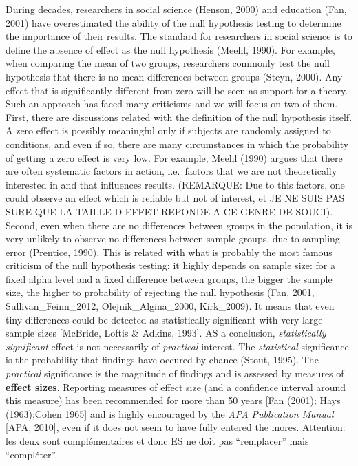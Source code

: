 \documentclass[man]{apa6}
\begin{document}
During decades, researchers in social science (Henson, 2000) and education (Fan, 2001) have overestimated the ability of the null hypothesis testing to determine the importance of their results. The standard for researchers in social science is to define the absence of effect as the null hypothesis (Meehl, 1990). For example, when comparing the mean of two groups, researchers commonly test the null hypothesis that there is no mean differences between groups (Steyn, 2000). Any effect that is significantly different from zero will be seen as support for a theory. Such an approach has faced many criticisms and we will focus on two of them. First, there are discussions related with the definition of the null hypothesis itself. A zero effect is possibly meaningful only if subjects are randomly assigned to conditions, and even if so, there are many circumstances in which the probability of getting a zero effect is very low. For example, Meehl (1990) argues that there are often systematic factors in action, i.e.~factors that we are not theoretically interested in and that influences
results. (REMARQUE: Due to this factors, one could observe an effect which is reliable but not of interest, et JE NE SUIS PAS SURE QUE LA TAILLE D EFFET REPONDE A CE GENRE DE SOUCI). Second, even when there are no differences between groups in the population, it is very unlikely to observe no differences between sample groups, due to sampling error (Prentice, 1990). This is related with what is probably the most famous criticism of the null hypothesis testing: it highly depends on sample size: for a fixed alpha level and a fixed difference between groups, the bigger the sample size, the higher to probability of rejecting the null hypothesis (Fan, 2001, Sullivan\_Feinn\_2012, Olejnik\_Algina\_2000, Kirk\_2009). It means that even tiny differences could be detected as statistically significant with very large sample sizes {[}McBride, Loftis \& Adkins, 1993{]}. AS a conclusion, \emph{statistically significant} effect is not necessarily of \emph{practical} interest. The \emph{statistical} significance is the probability that findings have occured by chance (Stout, 1995). The \emph{practical} significance is the magnitude of findings and is assessed by measures of \textbf{effect sizes}. Reporting measures of effect size (and a confidence interval around this measure) has been recommended for more than 50 years {[}Fan (2001); Hays (1963);Cohen 1965{]} and is highly encouraged by the \emph{APA Publication Manual} {[}APA, 2010{]}, even if it does not seem to have fully entered the mores. Attention: les deux sont complémentaires et donc ES ne doit pas \enquote{remplacer} mais \enquote{compléter}.
\end{document}
